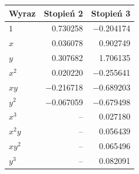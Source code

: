 \begin{tabular}{lrr}
\toprule
Wyraz & Stopień 2 & Stopień 3 \\
\midrule
$1$ & \num{0.730258} & \num{-0.204174} \\
$x$ & \num{0.036078} & \num{0.902749} \\
$y$ & \num{0.307682} & \num{1.706135} \\
$x^2$ & \num{0.020220} & \num{-0.255641} \\
$xy$ & \num{-0.216718} & \num{-0.689203} \\
$y^2$ & \num{-0.067059} & \num{-0.679498} \\
$x^3$ & -- & \num{0.027180} \\
$x^2y$ & -- & \num{0.056439} \\
$xy^2$ & -- & \num{0.065496} \\
$y^3$ & -- & \num{0.082091} \\
\bottomrule
\end{tabular}
